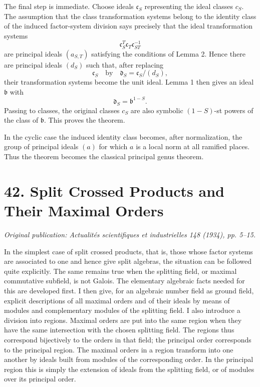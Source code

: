 \documentclass[11pt]{article}
\begin{document}
The final step is immediate. Choose ideals \(\mathfrak c_S\) representing the ideal classes \(c_S\). The assumption that the class transformation systems belong to the identity class of the induced factor-system division says precisely that the ideal transformation systems
\[
  \mathfrak c_S^T\mathfrak c_T\mathfrak c_{ST}^{-1}
\]
are principal ideals \((a_{S,T})\) satisfying the conditions of Lemma 2. Hence there are principal ideals \((d_S)\) such that, after replacing
\[
  \mathfrak c_S\quad\text{by}\quad \mathfrak d_S=\mathfrak c_S/(d_S),
\]
their transformation systems become the unit ideal. Lemma 1 then gives an ideal \(\mathfrak b\) with
\[
  \mathfrak d_S=\mathfrak b^{1-S}.
\]
Passing to classes, the original classes \(c_S\) are also symbolic \((1-S)\)-st powers of the class of \(\mathfrak b\). This proves the theorem.

In the cyclic case the induced identity class becomes, after normalization, the group of principal ideals \((a)\) for which \(a\) is a local norm at all ramified places. Thus the theorem becomes the classical principal genus theorem.

\clearpage
\section{42. Split Crossed Products and Their Maximal Orders}

\textit{Original publication: Actualités scientifiques et industrielles 148 (1934), pp. 5--15.}

In the simplest case of split crossed products, that is, those whose factor systems are associated to one and hence give split algebras, the situation can be followed quite explicitly. The same remains true when the splitting field, or maximal commutative subfield, is not Galois. The elementary algebraic facts needed for this are developed first. I then give, for an algebraic number field as ground field, explicit descriptions of all maximal orders and of their ideals by means of modules and complementary modules of the splitting field. I also introduce a division into regions. Maximal orders are put into the same region when they have the same intersection with the chosen splitting field. The regions thus correspond bijectively to the orders in that field; the principal order corresponds to the principal region. The maximal orders in a region transform into one another by ideals built from modules of the corresponding order. In the principal region this is simply the extension of ideals from the splitting field, or of modules over its principal order.
\end{document}
